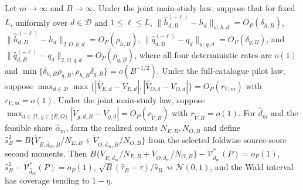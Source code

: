 Let \(m\to\infty\) and \(B\to\infty\). Under the joint main-study law, suppose that for fixed \(L\), uniformly over \(d\in\mathcal D\) and \(1\le\ell\le L\), \(\|\widehat h_{d,B}^{(-\ell)}-h_d\|_{w,h,d}=O_P(\delta_{h,B})\), \(\|\widehat h_{d,B}^{(-\ell)}-h_d\|_{2,O,h,d}=O_P(\rho_{h,B})\), \(\|\widehat q_{d,B}^{(-\ell)}-q_d\|_{w,q,d}=O_P(\delta_{q,B})\), and \(\|\widehat q_{d,B}^{(-\ell)}-q_d\|_{2,O,q,d}=O_P(\rho_{q,B})\), where all four deterministic rates are \(o(1)\) and \(\min\{\delta_{h,B}\rho_{q,B},\rho_{h,B}\delta_{q,B}\}=o(B^{-1/2})\). Under the full-catalogue pilot law, suppose \(\max_{d\in\mathcal D}\max\{|\widehat V_{E,d}-V_{E,d}|,|\widehat V_{O,d}-V_{O,d}|\}=O_P(r_{V,m})\) with \(r_{V,m}=o(1)\). Under the joint main-study law, suppose \(\max_{d\in\mathcal D,\,g\in\{E,O\}}|\widetilde V_{g,d,B}-V_{g,d}|=O_P(r_{\widetilde V,B})\) with \(r_{\widetilde V,B}=o(1)\). For \(\widehat d_m\) and the feasible share \(\widehat\alpha_m\), form the realized counts \(N_{E,B},N_{O,B}\) and define \(\widehat s_B^2=B\{\widetilde V_{E,\widehat d_m,B}/N_{E,B}+\widetilde V_{O,\widehat d_m,B}/N_{O,B}\}\) from the selected foldwise source-score second moments. Then \(B\{V_{E,\widehat d_m}/N_{E,B}+V_{O,\widehat d_m}/N_{O,B}\}-\mathcal V_{\widehat d_m}^*(P)=o_P(1)\), \(\widehat s_B^2-\mathcal V_{\widehat d_m}^*(P)=o_P(1)\), \(\sqrt B(\widehat\tau_B-\tau)/\widehat s_B\rightsquigarrow\mathcal N(0,1)\), and the Wald interval has coverage tending to \(1-\eta\).